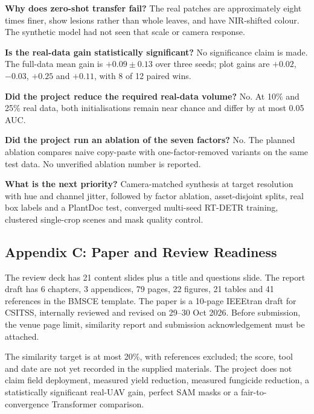 \documentclass[12pt,a4paper]{report}
\theoremstyle{definition}
\theoremstyle{remark}
\begin{document}
\textbf{Why does zero-shot transfer fail?} The real patches are approximately eight times finer, show lesions rather than whole leaves, and have NIR-shifted colour. The synthetic model had not seen that scale or camera response.

\textbf{Is the real-data gain statistically significant?} No significance claim is made. The full-data mean gain is $+0.09\pm0.13$ over three seeds; plot gains are $+0.02$, $-0.03$, $+0.25$ and $+0.11$, with 8 of 12 paired wins.

\textbf{Did the project reduce the required real-data volume?} No. At 10\% and 25\% real data, both initialisations remain near chance and differ by at most 0.05 AUC.

\textbf{Did the project run an ablation of the seven factors?} No. The planned ablation compares naive copy-paste with one-factor-removed variants on the same test data. No unverified ablation number is reported.

\textbf{What is the next priority?} Camera-matched synthesis at target resolution with hue and channel jitter, followed by factor ablation, asset-disjoint splits, real box labels and a PlantDoc test, converged multi-seed RT-DETR training, clustered single-crop scenes and mask quality control.

\subsection*{Appendix C: Paper and Review Readiness}
The review deck has 21 content slides plus a title and questions slide. The report draft has 6 chapters, 3 appendices, 79 pages, 22 figures, 21 tables and 41 references in the BMSCE template. The paper is a 10-page IEEEtran draft for CSITSS, internally reviewed and revised on 29--30 Oct 2026. Before submission, the venue page limit, similarity report and submission acknowledgement must be attached.

The similarity target is at most 20\%, with references excluded; the score, tool and date are not yet recorded in the supplied materials. The project does not claim field deployment, measured yield reduction, measured fungicide reduction, a statistically significant real-UAV gain, perfect SAM masks or a fair-to-convergence Transformer comparison.
\end{document}
